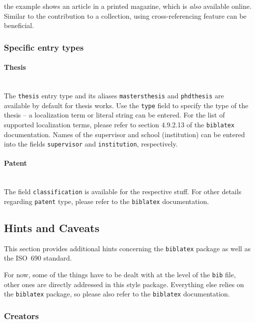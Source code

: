 \documentclass[a4paper,10pt]{ltxdockit}
\def\t|#1|{\texttt{#1}}
\begin{document}
\noindent the example shows an article in a printed magazine, which is 
\emph{also} available online. Similar to the contribution to a collection,
using cross-referencing feature can be beneficial.

\subsubsection{Specific entry types}

\paragraph{Thesis}\hfill\\

The \t|thesis| entry type and its aliases \t|mastersthesis| and
\t|phdthesis| are available by default for thesis works. Use the
\t|type| field to specify the type of the thesis -- a localization
term or literal string can be entered. For the list of supported
localization terms, please refer to section 4.9.2.13 of the
\t|biblatex| documentation. Names of the supervisor and school
(institution) can be entered into the fields \t|supervisor| and
\t|institution|, respectively.

\paragraph{Patent}\hfill\\

The field \t|classification| is available for the respective stuff.
For other details regarding \t|patent| type, please refer
to the \t|biblatex| documentation.

\subsection{Hints and Caveats}

This section provides additional hints concerning the \t|biblatex| package
as well as the ISO~690 standard.

For now, some of the things have to be dealt with at the level of the 
\t|bib| file, other ones are directly addressed in this style package.
Everything else relies on the \t|biblatex| package, so please also refer
to the \t|biblatex| documentation.

\subsubsection{Creators}
\end{document}
